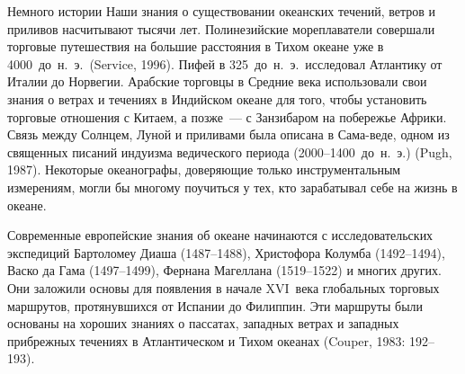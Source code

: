 
\begin{chapter}{Немного истории}\label{chap:2}
Наши знания о существовании океанских течений, ветров и приливов
насчитывают тысячи лет. Полинезийские мореплаватели совершали торговые
путешествия на большие расстояния в Тихом океане уже 
в 4000~до~н.~э.\ (Service, 1996). Пифей в 325~до~н.~э.\ исследовал Атлантику
от Италии до Норвегии. Арабские торговцы в Средние века использовали
свои знания о ветрах и течениях в Индийском океане для того, чтобы
установить торговые отношения с Китаем, а позже~--- с Занзибаром на
побережье Африки. Связь между Солнцем, Луной и приливами была
описана в Сама-веде, одном из священных писаний индуизма ведического 
периода (2000--1400~до~н.~э.) (Pugh, 1987). Некоторые океанографы, 
доверяющие только инструментальным измерениям, могли бы многому
поучиться у тех, кто зарабатывал себе на жизнь в океане.
%

Современные европейские знания об океане начинаются с
исследовательских экспедиций Бартоломеу Диаша (1487--1488), Христофора
Колумба (1492--1494), Васко да Гама (1497--1499), Фернана
Магеллана (1519--1522) и многих других. Они заложили
основы для появления в начале XVI~века глобальных торговых маршрутов,
протянувшихся от Испании до Филиппин. Эти маршруты были основаны на
хороших знаниях о пассатах, западных ветрах и западных прибрежных
течениях в Атлантическом и Тихом океанах (Couper, 1983: 192--193).
%


\end{chapter}
